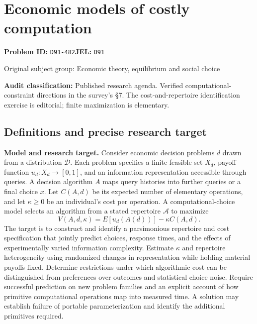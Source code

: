 \documentclass[11pt,a4paper]{article}
\begin{document}
\section*{Economic models of costly computation}
\textbf{Problem ID:} \texttt{D91-482}\quad \textbf{JEL:} \texttt{D91}\par
\label{problem:OP-0275}
{\sffamily\small\color{muted}Original subject group: Economic theory, equilibrium and social choice\par}
\label{definitions:problem:30007556}
\textbf{Audit classification:} Published research agenda. Verified computational-constraint directions in the survey’s §7. The cost-and-repertoire identification exercise is editorial; finite maximization is elementary.
\subsection*{Definitions and precise research target}
\textbf{Model and research target.} Consider economic decision problems \(d\) drawn from a distribution \(\mathcal D\). Each problem specifies a finite feasible set \(X_d\), payoff function \(u_d:X_d\to[0,1]\), and an information representation accessible through queries. A decision algorithm \(A\) maps query histories into further queries or a final choice \(x\). Let \(C(A,d)\) be its expected number of elementary operations, and let \(\kappa\geq0\) be an individual's cost per operation. A computational-choice model selects an algorithm from a stated repertoire \(\mathcal A\) to maximize
\[
 V(A,d,\kappa)=E[u_d(A(d))]-\kappa C(A,d).
\]
The target is to construct and identify a parsimonious repertoire and cost specification that jointly predict choices, response times, and the effects of experimentally varied information complexity. Estimate \(\kappa\) and repertoire heterogeneity using randomized changes in representation while holding material payoffs fixed. Determine restrictions under which algorithmic cost can be distinguished from preferences over outcomes and statistical choice noise. Require successful prediction on new problem families and an explicit account of how primitive computational operations map into measured time. A solution may establish failure of portable parameterization and identify the additional primitives required.
\end{document}
